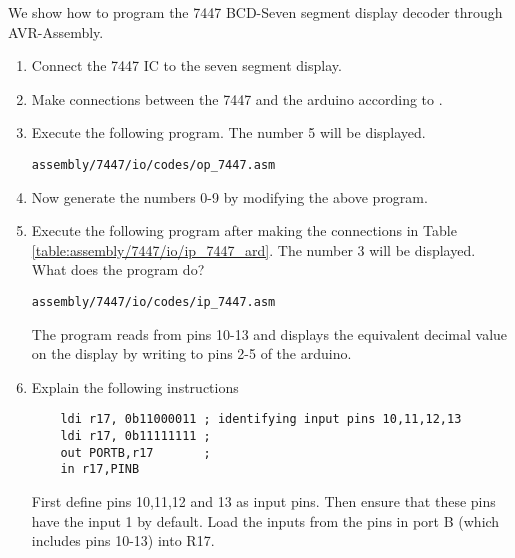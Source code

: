 We show how to program the 7447 BCD-Seven segment
display decoder through AVR-Assembly.
%
\begin{enumerate}[label=\arabic*.,ref=\theenumi]
\item Connect the 7447 IC to the seven segment display.
\item Make connections between the 7447 and the arduino according to 
.
\item Execute the following program.  The number 5 will be displayed.
\begin{lstlisting}
assembly/7447/io/codes/op_7447.asm
\end{lstlisting}
\item Now generate the numbers 0-9 by modifying the above program.
%
\item Execute the following program after making the connections in Table \ref{table:assembly/7447/io/ip_7447_ard}.  The number 3 will be displayed. What does the program do?
\begin{lstlisting}
assembly/7447/io/codes/ip_7447.asm
\end{lstlisting}
%
\begin{table}[!ht]
\centering

\caption{}
\label{table:assembly/7447/io/ip_7447_ard}
\end{table}
\solution The program reads from pins 10-13 and displays the equivalent decimal value on the display by writing to pins 2-5 of the arduino.
\item Explain the following instructions
\begin{lstlisting}
	ldi r17, 0b11000011 ; identifying input pins 10,11,12,13
	ldi r17, 0b11111111 ;
	out PORTB,r17		; 
	in r17,PINB
\end{lstlisting}
\solution First define pins 10,11,12 and 13 as input pins. Then ensure that these pins have the input 1 by default. Load the inputs from the pins in port B (which includes pins 10-13) into R17.
\end{enumerate}


